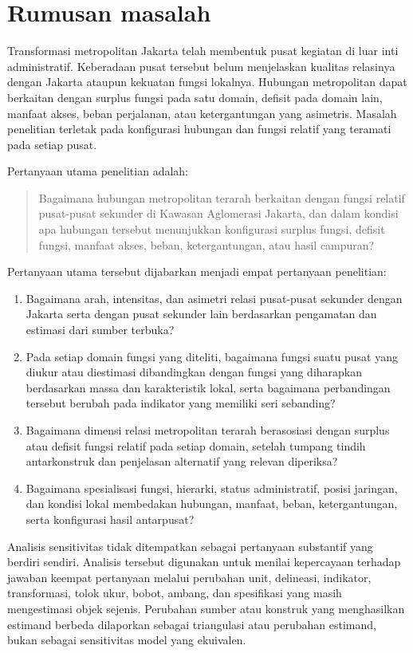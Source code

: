 \documentclass[11pt,a4paper,oneside,openany,indonesian]{report}
\begin{document}
\section{Rumusan masalah}

Transformasi metropolitan Jakarta telah membentuk pusat kegiatan di luar inti administratif. Keberadaan pusat tersebut belum menjelaskan kualitas relasinya dengan Jakarta ataupun kekuatan fungsi lokalnya. Hubungan metropolitan dapat berkaitan dengan surplus fungsi pada satu domain, defisit pada domain lain, manfaat akses, beban perjalanan, atau ketergantungan yang asimetris. Masalah penelitian terletak pada konfigurasi hubungan dan fungsi relatif yang teramati pada setiap pusat.

Pertanyaan utama penelitian adalah:

\begin{quote}
Bagaimana hubungan metropolitan terarah berkaitan dengan fungsi relatif pusat-pusat sekunder di Kawasan Aglomerasi Jakarta, dan dalam kondisi apa hubungan tersebut menunjukkan konfigurasi surplus fungsi, defisit fungsi, manfaat akses, beban, ketergantungan, atau hasil campuran?
\end{quote}

Pertanyaan utama tersebut dijabarkan menjadi empat pertanyaan penelitian:

\begin{enumerate}
  \item Bagaimana arah, intensitas, dan asimetri relasi pusat-pusat sekunder dengan Jakarta serta dengan pusat sekunder lain berdasarkan pengamatan dan estimasi dari sumber terbuka?
  \item Pada setiap domain fungsi yang diteliti, bagaimana fungsi suatu pusat yang diukur atau diestimasi dibandingkan dengan fungsi yang diharapkan berdasarkan massa dan karakteristik lokal, serta bagaimana perbandingan tersebut berubah pada indikator yang memiliki seri sebanding?
  \item Bagaimana dimensi relasi metropolitan terarah berasosiasi dengan surplus atau defisit fungsi relatif pada setiap domain, setelah tumpang tindih antarkonstruk dan penjelasan alternatif yang relevan diperiksa?
  \item Bagaimana spesialisasi fungsi, hierarki, status administratif, posisi jaringan, dan kondisi lokal membedakan hubungan, manfaat, beban, ketergantungan, serta konfigurasi hasil antarpusat?
\end{enumerate}

Analisis sensitivitas tidak ditempatkan sebagai pertanyaan substantif yang berdiri sendiri. Analisis tersebut digunakan untuk menilai kepercayaan terhadap jawaban keempat pertanyaan melalui perubahan unit, delineasi, indikator, transformasi, tolok ukur, bobot, ambang, dan spesifikasi yang masih mengestimasi objek sejenis. Perubahan sumber atau konstruk yang menghasilkan estimand berbeda dilaporkan sebagai triangulasi atau perubahan estimand, bukan sebagai sensitivitas model yang ekuivalen.
\end{document}
